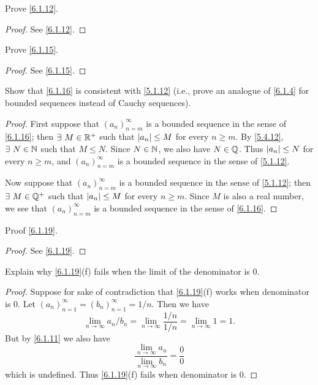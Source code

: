 \begin{ex}\label{ex:6.1.5}
  Prove \cref{6.1.12}.
\end{ex}

\begin{proof}
  See \cref{6.1.12}.
\end{proof}

\begin{ex}\label{ex:6.1.6}
  Prove \cref{6.1.15}.
\end{ex}

\begin{proof}
  See \cref{6.1.15}.
\end{proof}

\begin{ex}\label{ex:6.1.7}
  Show that \cref{6.1.16} is consistent with \cref{5.1.12}
  (i.e., prove an analogue of \cref{6.1.4} for bounded sequences instead of Cauchy sequences).
\end{ex}

\begin{proof}
  First suppose that \((a_n)_{n = m}^\infty\) is a bounded sequence in the sense of \cref{6.1.16};
  then \(\exists\ M \in \mathbb{R}^+\) such that \(\left\lvert a_n\right\rvert \leq M\) for every \(n \geq m\).
  By \cref{5.4.12}, \(\exists\ N \in \mathbb{N}\) such that \(M \leq N\).
  Since \(N \in \mathbb{N}\), we also have \(N \in \mathbb{Q}\).
  Thus \(\left\lvert a_n\right\rvert \leq N\) for every \(n \geq m\), and \((a_n)_{n = m}^\infty\) is a bounded sequence in the sense of \cref{5.1.12}.

  Now suppose that \((a_n)_{n = m}^\infty\) is a bounded sequence in the sense of \cref{5.1.12};
  then \(\exists\ M \in \mathbb{Q}^+\) such that \(\left\lvert a_n\right\rvert \leq M\) for every \(n \geq m\).
  Since \(M\) is also a real number, we see that \((a_n)_{n = m}^\infty\) is a bounded sequence in the sense of \cref{6.1.16}.
\end{proof}

\begin{ex}\label{ex:6.1.8}
  Proof \cref{6.1.19}.
\end{ex}

\begin{proof}
  See \cref{6.1.19}.
\end{proof}

\begin{ex}\label{ex:6.1.9}
  Explain why \cref{6.1.19}(f) fails when the limit of the denominator is \(0\).
\end{ex}

\begin{proof}
  Suppose for sake of contradiction that \cref{6.1.19}(f) works when denominator is \(0\).
  Let \((a_n)_{n = 1}^\infty = (b_n)_{n = 1}^\infty = 1 / n\).
  Then we have
  \[
    \lim_{n \to \infty} a_n / b_n = \lim_{n \to \infty} \dfrac{1 / n}{1 / n} = \lim_{n \to \infty} 1 = 1.
  \]
  But by \cref{6.1.11} we also have
  \[
    \dfrac{\lim_{n \to \infty} a_n}{\lim_{n \to \infty} b_n} = \dfrac{0}{0}
  \]
  which is undefined.
  Thus \cref{6.1.19}(f) fails when denominator is \(0\).
\end{proof}

